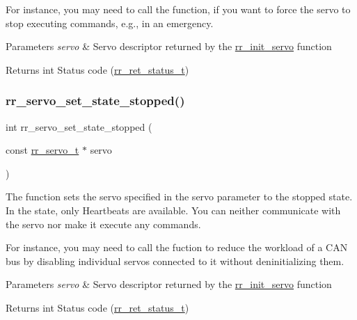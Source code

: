 For instance, you may need to call the function, if you want to force the servo to stop executing commands, e.\+g., in an emergency.


\begin{DoxyParams}{Parameters}
{\em servo} & Servo descriptor returned by the \hyperlink{group___common_ga0adb313a3eeb8a4399431e940a1f3e9e}{rr\+\_\+init\+\_\+servo} function \\
\hline
\end{DoxyParams}
\begin{DoxyReturn}{Returns}
int Status code (\hyperlink{api_8h_a92d5be5038abcf89837faf85a08debdc}{rr\+\_\+ret\+\_\+status\+\_\+t}) 
\end{DoxyReturn}
\mbox{\label{group___system__control_ga02ca530236f87db0fcac9e136eafda4d}} 
\subsubsection{\texorpdfstring{rr\+\_\+servo\+\_\+set\+\_\+state\+\_\+stopped()}{rr\_servo\_set\_state\_stopped()}}
{\footnotesize\ttfamily int rr\+\_\+servo\+\_\+set\+\_\+state\+\_\+stopped (\begin{DoxyParamCaption}\item[{const \hyperlink{structrr__servo__t}{rr\+\_\+servo\+\_\+t} $\ast$}]{servo }\end{DoxyParamCaption})}



The function sets the servo specified in the \textquotesingle{}servo\textquotesingle{} parameter to the stopped state. In the state, only Heartbeats are available. You can neither communicate with the servo nor make it execute any commands. 

For instance, you may need to call the fuction to reduce the workload of a C\+AN bus by disabling individual servos connected to it without deninitializing them.


\begin{DoxyParams}{Parameters}
{\em servo} & Servo descriptor returned by the \hyperlink{group___common_ga0adb313a3eeb8a4399431e940a1f3e9e}{rr\+\_\+init\+\_\+servo} function \\
\hline
\end{DoxyParams}
\begin{DoxyReturn}{Returns}
int Status code (\hyperlink{api_8h_a92d5be5038abcf89837faf85a08debdc}{rr\+\_\+ret\+\_\+status\+\_\+t}) 
\end{DoxyReturn}
